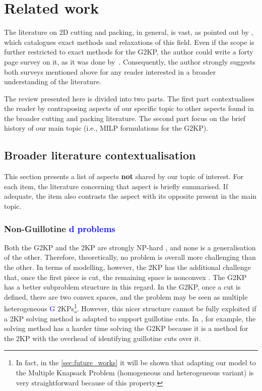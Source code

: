 \documentclass[ppgc,tese,english,formais,babel]{iiufrgs}
\newif\iffinalversion
\newcommand{\newtext}[1]{\iffinalversion%
#1%
\else%
\textcolor{blue}{#1}%
\fi%
}
\begin{document}
\chapter{Related work}
\label{sec:related_work}

The literature on 2D cutting and packing, in general, is vast, as pointed out by \citet{iori:2020}, which catalogues exact methods and relaxations of this field.
Even if the scope is further restricted to exact methods for the G2KP, the author could write a forty page survey on it, as it was done by~\citet{russo:2020}.
Consequently, the author strongly suggests both surveys mentioned above for any reader interested in a broader understanding of the literature.

The review presented here is divided into two parts. The first part contextualises the reader by contraposing aspects of our specific topic to other aspects found in the broader cutting and packing literature. The second part focus on the brief history of our main topic (i.e., MILP formulations for the G2KP).

\section{Broader literature contextualisation}

This section presents a list of aspects \textbf{not} shared by our topic of interest.
For each item, the literature concerning that aspect is briefly summarised.
If adequate, the item also contrasts the aspect with its opposite present in the main topic.

\subsection{Non-Guillotine\newtext{d problems}}

Both the G2KP and the 2KP are strongly NP-hard \citep{iori:2020}, and none is a generalisation of the other.
Therefore, theoretically, no problem is overall more challenging than the other.
In terms of modelling, however, the 2KP has the additional challenge that, once the first piece is cut, the remaining space is nonconvex \citep{fekete:1997}.
The G2KP has a better subproblem structure in this regard.
In the G2KP, once a cut is defined, there are two convex spaces, and the problem may be seen as multiple heterogeneous \newtext{G}2KPs\footnote{In fact, in the \cref{sec:future_works} it will be shown that adapting our model to the Multiple Knapsack Problem (homogeneous and heterogeneous variant) is very straightforward because of this property.}.
However, this nicer structure cannot be fully exploited if a 2KP solving method is adapted to support guillotine cuts.
In \citet{nascimento:2019}, for example, the solving method has a harder time solving the G2KP because it is a method for the 2KP with the overhead of identifying guillotine cuts over it.
\end{document}
